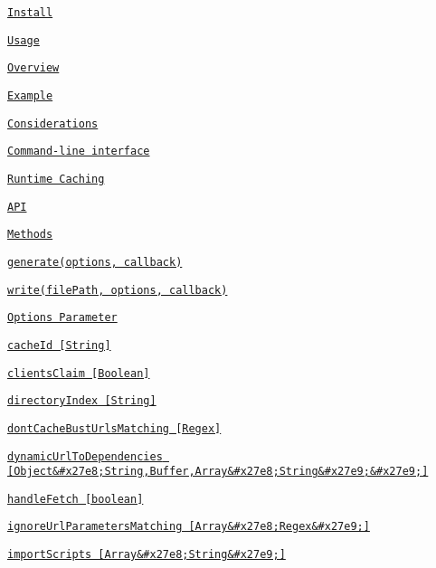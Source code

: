 \begin{DoxyItemize}
\item \href{#install}{\tt Install}
\item \href{#usage}{\tt Usage}
\begin{DoxyItemize}
\item \href{#overview}{\tt Overview}
\item \href{#example}{\tt Example}
\item \href{#considerations}{\tt Considerations}
\item \href{#command-line-interface}{\tt Command-\/line interface}
\end{DoxyItemize}
\item \href{#runtime-caching}{\tt Runtime Caching}
\item \href{#api}{\tt A\+PI}
\begin{DoxyItemize}
\item \href{#methods}{\tt Methods}
\begin{DoxyItemize}
\item \href{#generateoptions-callback}{\tt generate(options, callback)}
\item \href{#writefilepath-options-callback}{\tt write(file\+Path, options, callback)}
\end{DoxyItemize}
\item \href{#options-parameter}{\tt Options Parameter}
\begin{DoxyItemize}
\item \href{#cacheid-string}{\tt cache\+Id \mbox{[}String\mbox{]}}
\item \href{#clientsclaim-boolean}{\tt clients\+Claim \mbox{[}Boolean\mbox{]}}
\item \href{#directoryindex-string}{\tt directory\+Index \mbox{[}String\mbox{]}}
\item \href{#dontcachebusturlsmatching-regex}{\tt dont\+Cache\+Bust\+Urls\+Matching \mbox{[}Regex\mbox{]}}
\item \href{#dynamicurltodependencies-objectstringbufferarraystring}{\tt dynamic\+Url\+To\+Dependencies \mbox{[}Object\&\#x27e8;String,Buffer,Array\&\#x27e8;String\&\#x27e9;\&\#x27e9;\mbox{]}}
\item \href{#handlefetch-boolean}{\tt handle\+Fetch \mbox{[}boolean\mbox{]}}
\item \href{#ignoreurlparametersmatching-arrayregex}{\tt ignore\+Url\+Parameters\+Matching \mbox{[}Array\&\#x27e8;Regex\&\#x27e9;\mbox{]}}
\item \href{#importscripts-arraystring}{\tt import\+Scripts \mbox{[}Array\&\#x27e8;String\&\#x27e9;\mbox{]}}

\end{DoxyItemize}
\end{DoxyItemize}
\end{DoxyItemize}
